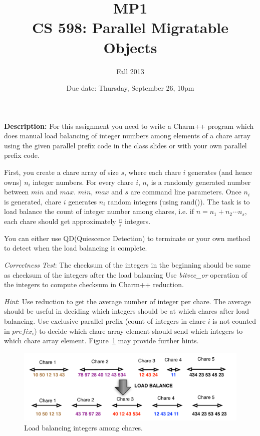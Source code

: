 \documentclass{article}
\title{MP1 \\ CS 598: Parallel Migratable Objects}
\author{Fall 2013}
\date{Due date: Thursday, September 26, 10pm}
\begin{document}
\maketitle

\textbf{Description:} 
For this assignment you need to write a Charm++ program which does manual load
balancing of integer numbers among elements of a chare array using the 
given parallel prefix code in the class slides or with your own parallel 
prefix code. 

First, you create a chare array of size $s$, where each chare $i$ generates 
(and hence owns) $n_i$ integer numbers. For every chare $i$, $n_i$ is a 
randomly generated number between $min$ and $max$. 
$min$, $max$ and $s$ are command line parameters. 
Once $n_i$ is generated, chare $i$ generates $n_i$ random 
integers (using rand()). The task is to load balance the count
of integer number among chares, i.e. if $n = n_1 + n_2 \cdots n_s$,
each chare should get approximately $\frac{n}{s}$ integers.

You can either use QD(Quiescence Detection) to terminate or your own method to detect when
the load balancing is complete.

\emph{Correctness Test}: The checksum of the integers in the beginning
should be same as checksum of the integers after the load balancing
Use \emph{bitvec\_or} operation of the integers to compute checksum in Charm++
reduction.

\emph{Hint}: Use reduction to get the average number of integer per chare. 
The average should be useful in deciding which integers should be at which chares
after load balancing. Use exclusive parallel prefix (count of integers in chare $i$
is not counted in $prefix_i $) to decide which chare array element 
should send which integers to which chare array element. Figure~\ref{prefix}
may provide further hints.

\begin{figure}
\centering
\includegraphics[width=\textwidth]{prob1.pdf}
\caption{Load balancing integers among chares.}
\label{prefix}
\end{figure}
\end{document}
